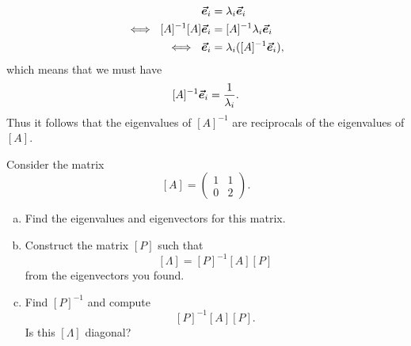 \documentclass[12pt]{article} %
\begin{document}
\begin{solution}
\begin{enumerate}[(a)]
    \begin{align*}
        [A]\evec_i &= \lambda_i \evec_i\\
        \iff ~ [A]^{-1}[A]\evec_i &= [A]^{-1}\lambda_i \evec_i\\
        \iff ~ \evec_i &= \lambda_i ([A]^{-1} \evec_i),
    \end{align*}
    which means that we must have
    \[
    [A]^{-1} \boldsymbol{\vec{e}}_i = \frac{1}{\lambda_i}.
    \]
    Thus it follows that the eigenvalues of $[A]^{-1}$ are reciprocals of the eigenvalues of $[A]$.
\end{enumerate}
\end{solution}

\newpage
\begin{problem}
Consider the matrix
\[
[A] = \begin{pmatrix} 1 & 1 \\ 0 & 2 \end{pmatrix}.
\]
\begin{enumerate}[(a)]
    \item Find the eigenvalues and eigenvectors for this matrix.
    \item Construct the matrix $[P]$ such that
    \[
    [\Lambda] = [P]^{-1}[A][P]
    \]
    from the eigenvectors you found. 
    \item Find $[P]^{-1}$ and compute
    \[
    [P]^{-1}[A][P].
    \]
    Is this $[\Lambda]$ diagonal?
\end{enumerate} 
\end{problem}
\end{document}
